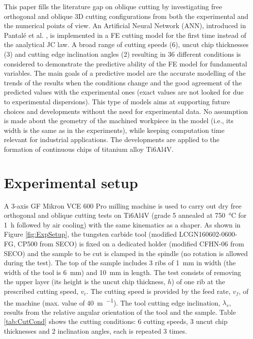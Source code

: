 \documentclass[preprint,12pt,times]{elsarticle}
\begin{document}
This paper fills the literature gap on oblique cutting by investigating free orthogonal and oblique 3D cutting configurations from both the experimental and the numerical points of view. An Artificial Neural Network (ANN), introduced in Pantalé et al. \cite{pantale_Efficient_2022}, is implemented in a FE cutting model for the first time instead of the analytical JC law. A broad range of cutting speeds (6), uncut chip thicknesses (3) and cutting edge inclination angles (2) resulting in 36 different conditions is considered to demonstrate the predictive ability of the FE model for fundamental variables. The main goals of a predictive model are the accurate modelling of the trends of the results when the conditions change and the good agreement of the predicted values with the experimental ones (exact values are not looked for due to experimental dispersions). This type of models aims at supporting future choices and developments without the need for experimental data. No assumption is made about the geometry of the machined workpiece in the model (i.e., its width is the same as in the experiments), while keeping computation time relevant for industrial applications. The developments are applied to the formation of continuous chips of titanium alloy Ti6Al4V.

\section{Experimental setup}
\label{ExpSet}

A 3-axis GF Mikron VCE 600 Pro milling machine is used to carry out dry free orthogonal and oblique cutting tests on Ti6Al4V (grade 5 annealed at \qty{750}{\degreeCelsius} for \qty{1}{\hour} followed by air cooling) with the same kinematics as a shaper. As shown in Figure \ref{fig:ExpSetup}, the tungsten carbide tool (modified LCGN160602-0600-FG, CP500 from SECO) is fixed on a dedicated holder (modified CFHN-06 from SECO) and the sample to be cut is clamped in the spindle (no rotation is allowed during the test). The top of the sample includes 3 ribs of \qty{1}{\mm} in width (the width of the tool is \qty{6}{\mm}) and \qty{10}{\mm} in length. The test consists of removing the upper layer (its height is the uncut chip thickness, $h$) of one rib at the prescribed cutting speed, $v_c$. The cutting speed is provided by the feed rate, $v_f$, of the machine (max. value of \qty{40}{\metre\per\min}). The tool cutting edge inclination, $\lambda_s$, results from the relative angular orientation of the tool and the sample. Table \ref{tab:CutCond} shows the cutting conditions: 6 cutting speeds, 3 uncut chip thicknesses and 2 inclination angles, each is repeated 3 times.
\end{document}
